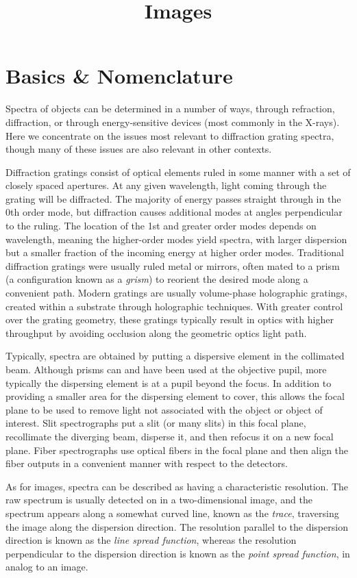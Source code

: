 \title{\bf Images}

\section{Basics \& Nomenclature}

Spectra of objects can be determined in a number of ways, through
refraction, diffraction, or through energy-sensitive devices (most
commonly in the X-rays). Here we concentrate on the issues most
relevant to diffraction grating spectra, though many of these issues
are also relevant in other contexts.

Diffraction gratings consist of optical elements ruled in some manner
with a set of closely spaced apertures. At any given wavelength, light
coming through the grating will be diffracted. The majority of energy
passes straight through in the 0th order mode, but diffraction causes
additional modes at angles perpendicular to the ruling. The location
of the 1st and greater order modes depends on wavelength, meaning the
higher-order modes yield spectra, with larger dispersion but a smaller
fraction of the incoming energy at higher order modes. Traditional
diffraction gratings were usually ruled metal or mirrors, often mated
to a prism (a configuration known as a {\it grism}) to reorient the
desired mode along a convenient path. Modern gratings are usually
volume-phase holographic gratings, created within a substrate through
holographic techniques. With greater control over the grating
geometry, these gratings typically result in optics with higher
throughput by avoiding occlusion along the geometric optics light
path.

Typically, spectra are obtained by putting a dispersive element in the
collimated beam. Although prisms can and have been used at the
objective pupil, more typically the dispersing element is at a pupil
beyond the focus. In addition to providing a smaller area for the
dispersing element to cover, this allows the focal plane to be used to
remove light not associated with the object or object of
interest. Slit spectrographs put a slit (or many slits) in this focal
plane, recollimate the diverging beam, disperse it, and then refocus
it on a new focal plane. Fiber spectrographs use optical fibers in the
focal plane and then align the fiber outputs in a convenient manner
with respect to the detectors.

As for images, spectra can be described as having a characteristic
resolution. The raw spectrum is usually detected on in a
two-dimensional image, and the spectrum appears along a somewhat
curved line, known as the {\it trace}, traversing the image along the
dispersion direction. The resolution parallel to the dispersion
direction is known as the {\it line spread function}, whereas the
resolution perpendicular to the dispersion direction is known as the
{\it point spread function}, in analog to an image.


